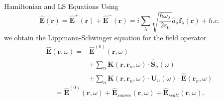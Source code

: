 \documentclass{beamer}
\begin{document}
\begin{frame}{Hamiltonian and LS Equations}
\fontsize{9}{-0.2}\selectfont
Using
\begin{equation}
 \label{eq:Esum}
 \hat{\mathbf{E}}(\mathbf{r})=\hat{\mathbf{E}}^+(\mathbf{r})+\hat{\mathbf{E}}^-(\mathbf{r})=i\sum_\lambda\sqrt{\frac{\hbar
\omega_\lambda}{2\varepsilon_0}}\hat{a}_\lambda\mathbf{f}_\lambda(\mathbf{r})+h.c.
\end{equation}
we obtain the Lippmann-Schwinger equation for the field operator
\begin{subequations}
\label{eq:ew1_1}
\begin{align}
\hat{\mathbf{E}}(\mathbf{r},\omega) =& \hat{\mathbf{E}}^{(0)}(\mathbf{r},\omega)\label{bareE0_1}\\
&+ \sum_n{\mathbf{K}(\mathbf{r},\mathbf{r}_n,\omega)\cdot\hat{\mathbf{S}}_n(\omega)}\label{sourceE_1}\\
&+ \sum_n{\mathbf{K}(\mathbf{r},\mathbf{r}_n,\omega)\cdot\mathbf{U}_n(\omega)\cdot\hat{\mathbf{E}}(\mathbf{r}_n,\omega)}\label{scatteringE_1}
\end{align}
\end{subequations}
%
\begin{equation}
 =\hat{\mathbf{E}}^{(0)}(\mathbf{r},\omega)+ \hat{\mathbf{E}}_{source}(\mathbf{r},\omega) +\hat{\mathbf{E}}_{scatt}(\mathbf{r},\omega)\label{eq:E0sourcescatt_1}.
\end{equation}
\end{frame}
\end{document}
